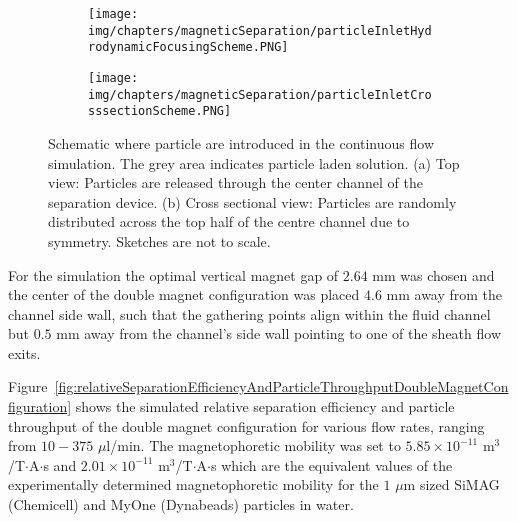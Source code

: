 \begin{figure}[htb]
        \centering
        \begin{subfigure}[b]{0.45\textwidth}
                \texttt{[image: img/chapters/magneticSeparation/particleInletHydrodynamicFocusingScheme.PNG]}
                \caption{}  
        \end{subfigure}
        \begin{subfigure}[b]{0.45\textwidth}
                \texttt{[image: img/chapters/magneticSeparation/particleInletCrosssectionScheme.PNG]}
                \caption{}                
        \end{subfigure}
        \caption[Schematic where particle are introduced in the continuous flow simulation]{Schematic where particle are introduced in the continuous flow simulation. The grey area indicates particle laden solution. (a) Top view: Particles are released through the center channel of the separation device. (b) Cross sectional view: Particles are randomly distributed across the top half of the centre channel due to symmetry. Sketches are not to scale.}
        \label{fig:particleIntroductionSchemeDoubleMagnetConfiguration}
\end{figure}

For the simulation the optimal vertical magnet gap of $2.64$ mm was chosen and the center of the double magnet configuration was placed $4.6$ mm away from the channel side wall, such that the gathering points align within the fluid channel but $0.5$ mm away from the channel's side wall pointing to one of the sheath flow exits.

Figure~\ref{fig:relativeSeparationEfficiencyAndParticleThroughputDoubleMagnetConfiguration} shows the simulated relative separation efficiency and particle throughput of the double magnet configuration for various flow rates, ranging from $10-375$ $\mu$l/min. The magnetophoretic mobility was set to $5.85 \times 10^{-11}$ m$^{3}$/T$\cdot$A$\cdot$s and  $2.01 \times 10^{-11}$ m$^{3}$/T$\cdot$A$\cdot$s which are the equivalent values of the experimentally determined magnetophoretic mobility for the $1$ $\mu$m sized SiMAG (Chemicell) and MyOne (Dynabeads) particles in water. 

